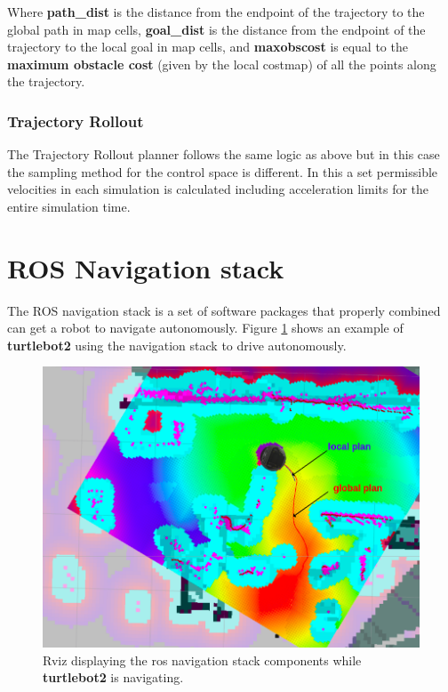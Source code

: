 \begin{itemize}
    Where \textbf{path\_dist} is the distance from the endpoint of the trajectory to the global path in map cells, \textbf{goal\_dist} is the distance from the endpoint of the trajectory to the local goal in map cells, and \textbf{maxobscost} is equal to the \textbf{maximum obstacle cost} (given by the local costmap) of all the points along the trajectory.
    \end{itemize}
\subsubsection{Trajectory Rollout} \label{tr}
The Trajectory Rollout planner follows the same logic as above but in this case the sampling method for the control space is different. In this a set permissible velocities
in each simulation is calculated including acceleration limits for the entire simulation
time\cite{inbookdwa}.
\section {ROS Navigation stack}
The ROS navigation stack is a set of software packages that properly combined can get a robot to navigate autonomously.
Figure \ref{fig:plans} shows an example of \textbf{turtlebot2} using the navigation stack to drive autonomously.
\begin{figure}[!htb]
    \centering
    \includegraphics[width=\linewidth]{imgs/chapter3/nav.png}
    \caption{Rviz displaying the ros navigation stack components while \textbf{turtlebot2} is navigating.}
    \label{fig:plans}
\end{figure}

